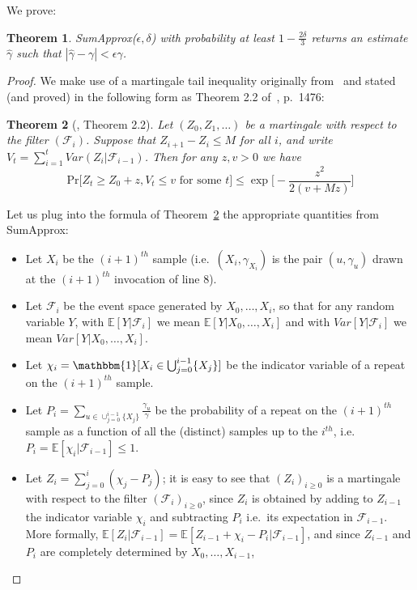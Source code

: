 \documentclass[a4paper,11pt]{article}
\newcommand{\E}{\mathbb{E}}
\newcommand{\prob}{\text{Pr}}
\newcommand{\sumest}{SumApprox}
\newtheorem{theorem}{Theorem}
\begin{document}
We prove:
\begin{theorem}
\label{thm:sumest_approx}
\sumest($\epsilon, \delta$) with probability at least $1 - \frac{2\delta}{3}$ returns an estimate $\hat{\gamma}$ such that $|\hat{\gamma} - \gamma| < \epsilon \gamma$.
\end{theorem}
\begin{proof}
\label{apx:proof_sumest_approx}
We make use of a martingale tail inequality originally from~\cite{Freedman1975} and stated (and proved) in the following form as Theorem 2.2 of~\cite{Alon&2010}, p.~1476:
\begin{theorem}[\cite{Alon&2010}, Theorem 2.2]
\label{thm:alon}
Let $(Z_0,Z_1,\ldots)$ be a martingale with respect to the filter $(\mathcal{F}_i)$. Suppose that $Z_{i+1}-Z_i \le M$ for all $i$, and write $V_t = \sum_{i=1}^t Var(Z_i|\mathcal{F}_{i-1})$. Then for any $z,v>0$ we have
\[
\prob\big[Z_t \ge Z_0 + z, V_t \le v \text{ for some } t\big] \le \exp\!{\Big[\!-\frac{z^2}{2(v+Mz)}\Big]}
\]
\end{theorem}
Let us plug into the formula of Theorem~\ref{thm:alon} the appropriate quantities from \sumest:
\begin{itemize}\itemsep0pt
\item Let $X_i$ be the $(i+1)^{th}$ sample (i.e.\ $(X_i, \gamma_{X_i})$ is the pair $(u,\gamma_u)$ drawn at the $(i+1)^{th}$ invocation of line 8).
\item Let $\mathcal{F}_i$ be the event space generated by $X_0, \dots, X_i$, so that for any random variable $Y$, with $\E[Y|\mathcal{F}_i]$ we mean $\E[Y|X_0,\dots,X_i]$ and with $Var[Y|\mathcal{F}_i]$ we mean $Var[Y|X_0,\dots,X_i]$.
\item Let $\chi_i = \mathbbm{1}[X_i \in \bigcup_{j=0}^{i-1}\{X_j\}]$ be the indicator variable of a repeat on the $(i+1)^{th}$ sample.
\item Let $P_i=\sum_{u\in \cup_{j=0}^{i-1} \{X_j\}}\! \frac{\gamma_{u}}{\gamma}$ be the probability of a repeat on the $(i+1)^{th}$ sample as a function of all the (distinct) samples up to the $i^{th}$,
i.e.\ $P_i=\E[\chi_i|\mathcal{F}_{i-1}] \le 1$.
\item Let $Z_i=\sum_{j=0}^i (\chi_j - P_{j})$;
it is easy to see that $(Z_i)_{i \ge 0}$ 
is a martingale with respect to the filter $(\mathcal{F}_i)_{i\ge 0}$, since $Z_i$ is obtained by adding to $Z_{i-1}$ the indicator variable $\chi_i$ and subtracting $P_i$ i.e.\ its expectation in $\mathcal{F}_{i-1}$.
More formally, $\E[Z_i|\mathcal{F}_{i-1}]=\E[Z_{i-1} + \chi_i- P_i|\mathcal{F}_{i-1}]$, and since $Z_{i-1}$ and $P_i$ are completely determined by $X_0,\dots,X_{i-1}$,

\end{itemize}
\end{proof}
\end{document}
